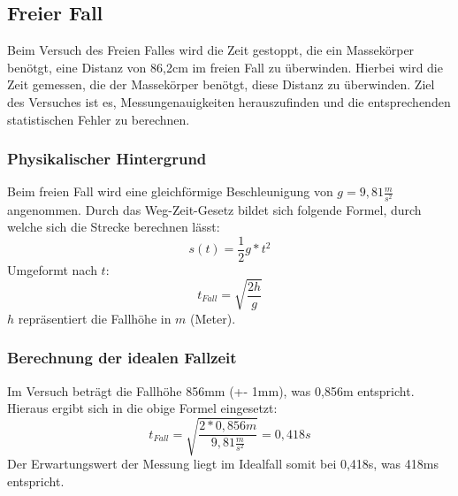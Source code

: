 \subsection{Freier Fall}
Beim Versuch des Freien Falles wird die Zeit gestoppt, die ein Massekörper benötgt, eine Distanz von 86,2cm im freien Fall zu überwinden. Hierbei wird die Zeit gemessen, die der Massekörper benötgt, diese Distanz zu überwinden.
Ziel des Versuches ist es, Messungenauigkeiten herauszufinden und die entsprechenden statistischen Fehler zu berechnen.

\subsubsection{Physikalischer Hintergrund}
Beim freien Fall wird eine gleichförmige Beschleunigung von $g=9,81\frac{m}{s^{2}}$ angenommen. Durch das Weg-Zeit-Gesetz bildet sich folgende Formel, durch welche sich die Strecke berechnen lässt:
\begin{equation}
    s(t)=\frac{1}{2}g*t^{2}
\end{equation}
Umgeformt nach $t$:
\begin{equation}
    t_{Fall}=\sqrt{\frac{2h}{g}}
\end{equation}
$h$ repräsentiert die Fallhöhe in $m$ (Meter).

\subsubsection{Berechnung der idealen Fallzeit}
Im Versuch beträgt die Fallhöhe 856mm (+- 1mm), was 0,856m entspricht. Hieraus ergibt sich in die obige Formel eingesetzt:
\begin{equation}
    t_{Fall}=\sqrt{\frac{2*0,856m}{9,81\frac{m}{s^{2}}}}=0,418s
\end{equation}
Der Erwartungswert der Messung liegt im Idealfall somit bei 0,418s, was 418ms entspricht.

